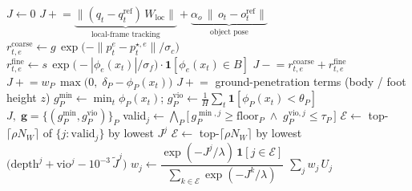 \begin{algorithm}[t]
\caption{Multi-Scale Contact Reward and Part-wise Penetration Constraints,
         with Gated-Elite Selection}
\label{alg:cost-gate}
\begin{algorithmic}[1]
  \State $J \gets 0$
    \State $J \mathrel{+}= \underbrace{\big\| (q_t - q^{\mathrm{ref}}_t)\,W_{\text{loc}} \big\|}_{\text{local-frame tracking}}
                         + \underbrace{\alpha_o\,\|\,o_t - o^{\mathrm{ref}}_t\|}_{\text{object pose}}$
      \State $r^{\mathrm{coarse}}_{t,e} \gets g\,\exp\!\big(-\|p^e_t - p^{\star,e}_t\|/\sigma_c\big)$
      \State $r^{\mathrm{fine}}_{t,e} \gets s\,\exp\!\big(-|\phi_{e}(x_t)|/\sigma_f\big)\cdot \mathbf 1[\phi_e(x_t)\in B]$
      \State $J \mathrel{-}= r^{\mathrm{coarse}}_{t,e} + r^{\mathrm{fine}}_{t,e}$
    \EndFor
      \State $J \mathrel{+}= w_P\,\max\!\big(0,\; \delta_P - \phi_P(x_t)\big)$
    \EndFor
    \State $J \mathrel{+}= $ ground-penetration terms (body / foot height $z$)
  \EndFor
    \State $g^{\min}_P \gets \min_t \phi_P(x_t)$;\quad
           $g^{\text{vio}}_P \gets \tfrac1H\sum_t \mathbf 1[\phi_P(x_t) < \theta_P]$
  \EndFor
  \State \Return $J,\; \mathbf g = \{(g^{\min}_P, g^{\text{vio}}_P)\}_P$
\EndFunction
\Statex
{}
  \State valid$_j \gets \bigwedge_P \big[\, g^{\min,j}_P \ge \text{floor}_P \;\wedge\; g^{\text{vio},j}_P \le \tau_P \,\big]$
    \State $\mathcal E \gets$ top-$\lceil\rho N_W\rceil$ of $\{j:\text{valid}_j\}$ by lowest $J^j$
  \Else                                                   {}
    \State $\mathcal E \gets$ top-$\lceil\rho N_W\rceil$ by lowest
           $\big(\text{depth}^j + \text{vio}^j - 10^{-3}\,\tilde J^j\big)$
  \EndIf
  \State $w_j \gets \dfrac{\exp(-J^j/\lambda)\,\mathbf 1[j\in\mathcal E]}{\sum_{k\in\mathcal E}\exp(-J^k/\lambda)}$
  \State \Return $\sum_j w_j\,U_j$                        
\EndFunction
\end{algorithmic}
\end{algorithm}
